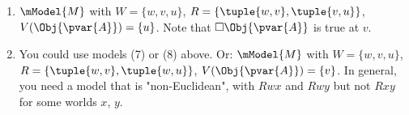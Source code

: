 \documentclass[../../../include/open-logic-section]{subfiles}
\begin{document}
\begin{prob}
\begin{ans}
\begin{enumerate}
            \item $\mModel{M}$ with $W=\{w,v,u\}$, $R=\{\tuple{w,v},\tuple{v,u}\}$, 
                $V(\Obj{\pvar{A}})=\{u\}$. Note that $\Box\Obj{\pvar{A}}$ is true at $v$.
            \item You could use models (7) or (8) above. Or: $\mModel{M}$ with 
                $W=\{w,v,u\}$, $R=\{\tuple{w,v},\tuple{w,u}\}$, 
                $V(\Obj{\pvar{A}})=\{v\}$. In general, you need a model that is 
                "non-Euclidean", with $Rwx$ and $Rwy$ but not $Rxy$ for some
                worlds $x$, $y$. 
        \end{enumerate}
    \end{ans}
    
    \end{prob}
\end{document}
